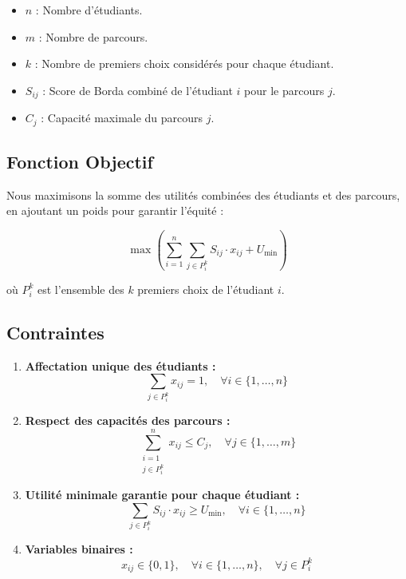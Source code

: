 \documentclass[a4paper,11pt]{article}
\begin{document}
\begin{itemize}
    \item $n$ : Nombre d'étudiants.
    \item $m$ : Nombre de parcours.
    \item $k$ : Nombre de premiers choix considérés pour chaque étudiant.
    \item $S_{ij}$ : Score de Borda combiné de l'étudiant $i$ pour le parcours $j$.
    \item $C_j$ : Capacité maximale du parcours $j$.
\end{itemize}

\subsection*{Fonction Objectif}

Nous maximisons la somme des utilités combinées des étudiants et des parcours, en ajoutant un poids pour garantir l'équité :

\[
\max \left( \sum_{i=1}^{n} \sum_{j \in P_i^k} S_{ij} \cdot x_{ij} + U_{\min} \right)
\]

où $P_i^k$ est l'ensemble des $k$ premiers choix de l'étudiant $i$.

\subsection*{Contraintes}

\begin{enumerate}
    \item \textbf{Affectation unique des étudiants :}
    \[
    \sum_{j \in P_i^k} x_{ij} = 1, \quad \forall i \in \{1, \dots, n\}
    \]

    \item \textbf{Respect des capacités des parcours :}
    \[
    \sum_{\substack{i=1 \\ j \in P_i^k}}^{n} x_{ij} \leq C_j, \quad \forall j \in \{1, \dots, m\}
    \]

    \item \textbf{Utilité minimale garantie pour chaque étudiant :}
    \[
    \sum_{j \in P_i^k} S_{ij} \cdot x_{ij} \geq U_{\min}, \quad \forall i \in \{1, \dots, n\}
    \]

    \item \textbf{Variables binaires :}
    \[
    x_{ij} \in \{0, 1\}, \quad \forall i \in \{1, \dots, n\}, \quad \forall j \in P_i^k
    \]
\end{enumerate}
\end{document}
